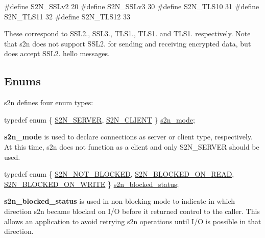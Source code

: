 \begin{DoxyCode}
\textcolor{preprocessor}{#define S2N\_SSLv2 20}
\textcolor{preprocessor}{#define S2N\_SSLv3 30}
\textcolor{preprocessor}{#define S2N\_TLS10 31}
\textcolor{preprocessor}{#define S2N\_TLS11 32}
\textcolor{preprocessor}{#define S2N\_TLS12 33}
\end{DoxyCode}


These correspond to S\+S\+L2., S\+S\+L3., T\+L\+S1., T\+L\+S1. and T\+L\+S1. respectively. Note that s2n does not support S\+S\+L2. for sending and receiving encrypted data, but does accept S\+S\+L2. hello messages.

\subsection*{Enums}

s2n defines four enum types\+:


\begin{DoxyCode}
\textcolor{keyword}{typedef} \textcolor{keyword}{enum} \{ \hyperlink{s2n_8h_a77a64e3b657f90d221c5faf99c643cdba6d8d11a87ee62316e49b1b166c2b2c52}{S2N\_SERVER}, \hyperlink{s2n_8h_a77a64e3b657f90d221c5faf99c643cdbac93ba9ce574a0b5893fe2a5960e1785d}{S2N\_CLIENT} \} \hyperlink{s2n_8h_a77a64e3b657f90d221c5faf99c643cdb}{s2n\_mode};
\end{DoxyCode}


{\bfseries s2n\+\_\+mode} is used to declare connections as server or client type, respectively. At this time, s2n does not function as a client and only S2\+N\+\_\+\+S\+E\+R\+V\+ER should be used.


\begin{DoxyCode}
\textcolor{keyword}{typedef} \textcolor{keyword}{enum} \{ \hyperlink{s2n_8h_af70ca0b089daa98cd79a424d3f6af15da7afdc9e789b567fe89c7142f34ec3ebd}{S2N\_NOT\_BLOCKED}, \hyperlink{s2n_8h_af70ca0b089daa98cd79a424d3f6af15daf76a7c83e9548139b7b8d50bdd5ff323}{S2N\_BLOCKED\_ON\_READ}, 
      \hyperlink{s2n_8h_af70ca0b089daa98cd79a424d3f6af15daefb6db9aaec431d69fc4c1249bc432e3}{S2N\_BLOCKED\_ON\_WRITE} \} \hyperlink{s2n_8h_af70ca0b089daa98cd79a424d3f6af15d}{s2n\_blocked\_status};
\end{DoxyCode}


{\bfseries s2n\+\_\+blocked\+\_\+status} is used in non-\/blocking mode to indicate in which direction s2n became blocked on I/O before it returned control to the caller. This allows an application to avoid retrying s2n operations until I/O is possible in that direction.


